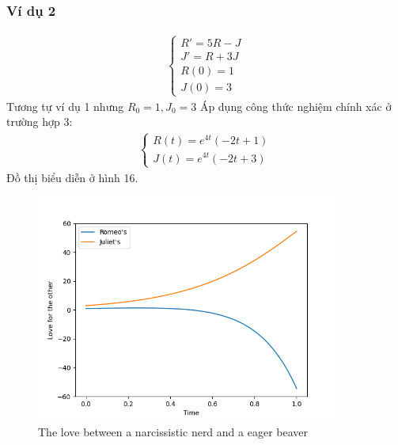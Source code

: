 \subsubsection{Ví dụ 2}
\begin{align*}
    \begin{cases}
        R'=5R-J\\
        J'=R+3J\\
        R(0)=1\\
        J(0)=3
    \end{cases}
\end{align*}
Tương tự ví dụ 1 nhưng $R_0 = 1, J_0 = 3$ Áp dụng công thức nghiệm chính xác ở trường hợp 3:
\begin{align*}
    \begin{cases}
        R(t)=e^{4t}(-2t+1)\\
        J(t)=e^{4t}(-2t+3)
    \end{cases}
\end{align*}
Đồ thị biểu diễn ở hình 16.
\begin{figure}[h!]
    \begin{center}
    \includegraphics[width=10cm]{images/narcissistic_nerd_2.png}
    \end{center}
    \caption{The love between a narcissistic nerd and a eager beaver}
\end{figure}
